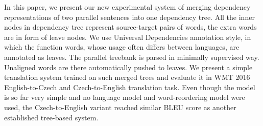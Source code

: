 In this paper, we present our new experimental system of merging dependency representations of two parallel sentences into one dependency tree. All the inner nodes in dependency tree represent source-target pairs of words, the extra words are in form of leave nodes. We use Universal Dependencies annotation style, in which the function words, whose usage often differs between languages, are annotated as leaves. The parallel treebank is parsed in minimally supervised way. Unaligned words are there automatically pushed to leaves. We present a simple translation system trained on such merged trees and evaluate it in WMT 2016 English-to-Czech and Czech-to-English translation task. Even though the model is so far very simple and no language model and word-reordering model were used, the Czech-to-English variant reached similar BLEU score as another established tree-based system.
